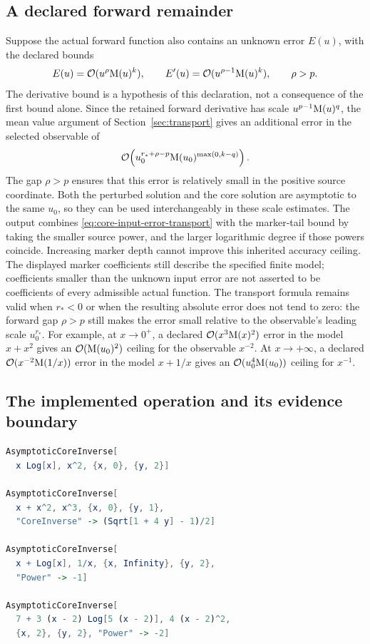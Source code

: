 \subsection{A declared forward remainder}

Suppose the actual forward function also contains an unknown error $E(u)$,
with the declared bounds
\begin{equation}
 E(u)=\mathcal O(u^\rho\mathrm M(u)^k),\qquad
 E'(u)=\mathcal O(u^{\rho-1}\mathrm M(u)^k),\qquad \rho>p.
 \label{eq:core-declared-input-error}
\end{equation}
The derivative bound is a hypothesis of this declaration, not a consequence
of the first bound alone. Since the retained forward derivative has scale
$u^{p-1}\mathrm M(u)^q$, the mean value argument of
Section~\ref{sec:transport} gives an additional error in the selected
observable of
\begin{equation}
 \mathcal O\!\left(u_0^{r_*+\rho-p}
       \mathrm M(u_0)^{\max(0,k-q)}\right).
 \label{eq:core-input-error-transport}
\end{equation}
The gap $\rho>p$ ensures that this error is relatively small in the
positive source coordinate. Both the perturbed solution and the core
solution are asymptotic to the same $u_0$, so they can be used
interchangeably in these scale estimates. The output combines
\eqref{eq:core-input-error-transport} with the marker-tail bound by taking
the smaller source power, and the larger logarithmic degree if those
powers coincide. Increasing marker depth cannot improve this inherited
accuracy ceiling. The displayed marker coefficients still describe the
specified finite model; coefficients smaller than the unknown input error
are not asserted to be coefficients of every admissible actual function.
The transport formula remains valid when $r_*<0$ or when the resulting
absolute error does not tend to zero: the forward gap $\rho>p$ still makes
the error small relative to the observable's leading scale $u_0^{r_*}$.
For example, at $x\to0^+$, a declared $\mathcal O(x^3\mathrm M(x)^2)$ error in the
model $x+x^2$ gives an $\mathcal O(\mathrm M(u_0)^2)$ ceiling for the observable $x^{-2}$.
At $x\to+\infty$, a declared $\mathcal O(x^{-2}\mathrm M(1/x))$ error in the model
$x+1/x$ gives an $\mathcal O(u_0^4\mathrm M(u_0))$ ceiling for $x^{-1}$.

\subsection{The implemented operation and its evidence boundary}

\begin{lstlisting}[language=Mathematica]
AsymptoticCoreInverse[
  x Log[x], x^2, {x, 0}, {y, 2}]

AsymptoticCoreInverse[
  x + x^2, x^3, {x, 0}, {y, 1},
  "CoreInverse" -> (Sqrt[1 + 4 y] - 1)/2]

AsymptoticCoreInverse[
  x + Log[x], 1/x, {x, Infinity}, {y, 2},
  "Power" -> -1]

AsymptoticCoreInverse[
  7 + 3 (x - 2) Log[5 (x - 2)], 4 (x - 2)^2,
  {x, 2}, {y, 2}, "Power" -> -2]
\end{lstlisting}


